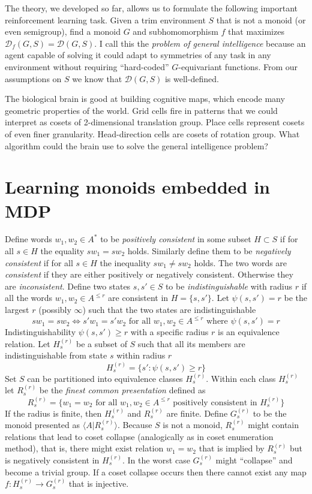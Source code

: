 \documentclass[oneside,english,logo]{amuthesis}
\begin{document}
The theory, we developed so far, allows us to formulate the following important reinforcement learning task. Given a trim environment $S$ that is not a monoid (or even semigroup), find a monoid $G$ and subhomomorphism $f$ that maximizes $\mathcal{D}_f(G,S)=\mathcal{D}(G,S)$. 
I call this the \textit{problem of general intelligence} because an agent capable of solving it could adapt to symmetries of any task in any environment without requiring ``hard-coded'' $G$-equivariant functions. From our assumptions on $S$ we know that $\mathcal{D}(G,S)$ is well-defined. 



The biological brain is good at building cognitive maps, which encode many geometric properties of the world. Grid cells fire in patterns that we could interpret as cosets of 2-dimensional translation group. Place cells represent cosets of even finer granularity. Head-direction cells are cosets of rotation group. What algorithm could the brain use to solve the general intelligence problem?





\section{Learning monoids embedded in MDP}
\label{subsection:learning_embedded_monoids}
Define words $w_1,w_2\in A^*$ to be \textit{positively consistent} in some subset $H\subset S$ if for all $s\in H$ the equality $sw_1=sw_2$ holds. Similarly define them to be \textit{negatively consistent} if for all $s\in H$ the inequality $sw_1\ne sw_2$ holds. The two words are \textit{consistent} if they are either positively or negatively consistent. Otherwise they are \textit{inconsistent}.
Define two states $s,s'\in S$ to be \textit{indistinguishable} with radius $r$ if all the words $w_1,w_2\in A^{\le r}$ are consistent in $H=\{s,s'\}$. Let 
$\psi(s,s')=r$ be the largest $r$ (possibly $\infty$) such that the two states are indistinguishable
\[
sw_1=sw_2 \iff s'w_1=s'w_2\text{ for all }w_1,w_2\in A^{\le r}\text{ where }\psi(s,s')=r
\]
Indistinguishability $\psi(s,s')\ge r$ with a specific radius $r$ is an equivalence relation. Let $H_{s}^{(r)}$ be a subset of $S$ such that all its members are indistinguishable from state $s$ within radius $r$
\[
H_{s}^{(r)} = \{s' : \psi(s,s')\ge r \}
\]
Set $S$ can be partitioned into equivalence classes $H_{s}^{(r)}$.
Within each class  $H_{s}^{(r)}$ let  $R_{s}^{(r)}$ be the \textit{finest common presentation} defined as
\[
R_{s}^{(r)} = \{ w_1=w_2 \text{ for all }w_1,w_2\in A^{\le r}\text{ positively consistent in }H_{s}^{(r)}  \}
\]
If the radius is finite, then $H_{s}^{(r)}$ and $R_{s}^{(r)}$ are finite. Define $G_{s}^{(r)}$ to be the monoid presented as $\langle A | R_{s}^{(r)} \rangle$.
Because $S$ is not a monoid, $R_{s}^{(r)}$ might contain relations that lead to coset collapse (analogically as in coset enumeration method), that is, there might exist relation $w_1=w_2$ that is implied by $R_{s}^{(r)}$ but is negatively consistent in $H_{s}^{(r)}$. In the worst case $G_{s}^{(r)}$ might ``collapse'' and become a trivial group.  If a coset collapse occurs then there cannot exist any map $f:H_{s}^{(r)} \rightarrow G_{s}^{(r)}$ that is injective.  
\end{document}
